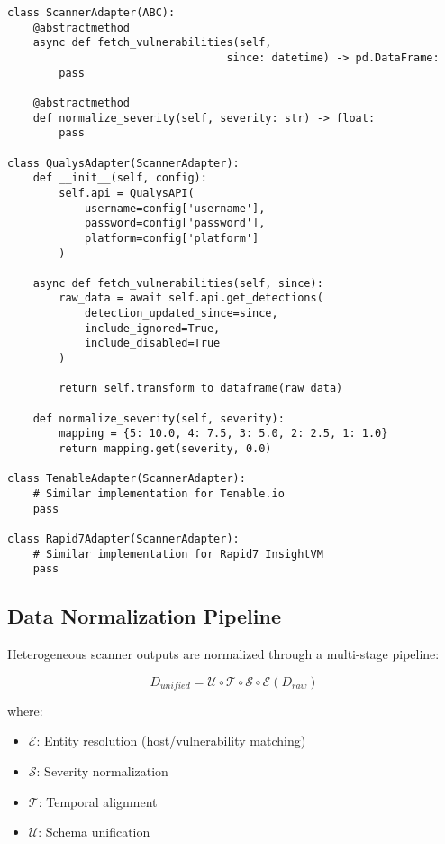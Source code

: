 \documentclass[11pt,a4paper]{article}
\begin{document}
\begin{lstlisting}[caption={Scanner Integration Layer},label={lst:scanner}]
class ScannerAdapter(ABC):
    @abstractmethod
    async def fetch_vulnerabilities(self, 
                                  since: datetime) -> pd.DataFrame:
        pass
    
    @abstractmethod
    def normalize_severity(self, severity: str) -> float:
        pass

class QualysAdapter(ScannerAdapter):
    def __init__(self, config):
        self.api = QualysAPI(
            username=config['username'],
            password=config['password'],
            platform=config['platform']
        )
    
    async def fetch_vulnerabilities(self, since):
        raw_data = await self.api.get_detections(
            detection_updated_since=since,
            include_ignored=True,
            include_disabled=True
        )
        
        return self.transform_to_dataframe(raw_data)
    
    def normalize_severity(self, severity):
        mapping = {5: 10.0, 4: 7.5, 3: 5.0, 2: 2.5, 1: 1.0}
        return mapping.get(severity, 0.0)

class TenableAdapter(ScannerAdapter):
    # Similar implementation for Tenable.io
    pass

class Rapid7Adapter(ScannerAdapter):
    # Similar implementation for Rapid7 InsightVM
    pass
\end{lstlisting}

\subsection{Data Normalization Pipeline}

Heterogeneous scanner outputs are normalized through a multi-stage pipeline:

\begin{equation}
D_{unified} = \mathcal{U} \circ \mathcal{T} \circ \mathcal{S} \circ \mathcal{E}(D_{raw})
\end{equation}

where:
\begin{itemize}
\item $\mathcal{E}$: Entity resolution (host/vulnerability matching)
\item $\mathcal{S}$: Severity normalization
\item $\mathcal{T}$: Temporal alignment
\item $\mathcal{U}$: Schema unification
\end{itemize}
\end{document}
